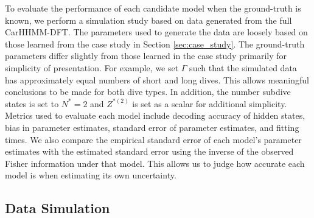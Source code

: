 

To evaluate the performance of each candidate model when the ground-truth is known, we perform a simulation study based on data generated from the full CarHHMM-DFT. The parameters used to generate the data are loosely based on those learned from the case study in Section \ref{sec:case_study}. The ground-truth parameters differ slightly from those learned in the case study primarily for simplicity of presentation. For example, we set $\Gamma$ such that the simulated data has approximately equal numbers of short and long dives. This allows meaningful conclusions to be made for both dive types. In addition, the number subdive states is set to $N^*=2$ and $Z^{*(2)}$ is set as a scalar for additional simplicity. Metrics used to evaluate each model include decoding accuracy of hidden states, bias in parameter estimates, standard error of parameter estimates, and fitting times. We also compare the empirical standard error of each model's parameter estimates with the estimated standard error using the inverse of the observed Fisher information under that model. This allows us to judge how accurate each model is when estimating its own uncertainty.

\subsection{Data Simulation}


